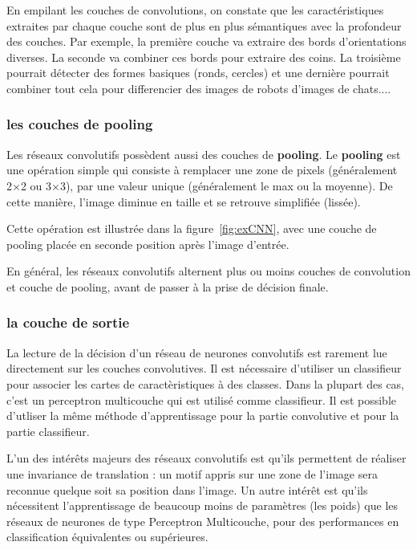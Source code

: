 En empilant les couches de convolutions, on constate que les caractéristiques
extraites par chaque couche sont de plus en plus sémantiques avec la profondeur
des couches. Par exemple, la première couche va extraire des bords
d'orientations diverses. La seconde va combiner ces bords pour extraire des
coins. La troisième pourrait détecter des formes basiques (ronds, cercles)
et une dernière pourrait combiner tout cela pour differencier des images de
robots d'images de chats....

\subsubsection{les couches de pooling}

Les réseaux convolutifs possèdent aussi des couches de \textbf{pooling}.
Le \textbf{pooling} est une opération simple qui consiste à remplacer une zone
de pixels (généralement 2×2 ou 3×3), par une valeur unique
(généralement le max ou la moyenne).
De cette manière, l’image diminue en taille et se retrouve simplifiée (lissée).

Cette opération est illustrée dans la figure~\ref{fig:exCNN}, avec une couche
de pooling placée en seconde position après l'image d'entrée.

En général, les réseaux convolutifs alternent plus ou moins couches de
convolution et couche de pooling, avant de passer à la prise de décision finale.

\subsubsection{la couche de sortie}

La lecture de la décision d'un réseau de neurones convolutifs est rarement lue directement
sur les couches convolutives.
Il est nécessaire d'utiliser un classifieur pour associer les cartes de caractèristiques
à des classes.
Dans la plupart des cas, c'est un perceptron multicouche qui est utilisé comme classifieur. Il est possible d'utliser la même méthode d'apprentissage pour la partie convolutive et pour la partie classifieur.


L'un des intérêts majeurs des réseaux convolutifs est qu'ils permettent de
réaliser une invariance de translation :
un motif appris sur une zone de l'image sera reconnue quelque soit sa position
dans l'image.
Un autre intérêt est qu'ils nécessitent l'apprentissage de beaucoup moins de
paramètres (les poids) que les réseaux de neurones de type Perceptron
Multicouche, pour des performances en classification équivalentes ou
supérieures.

